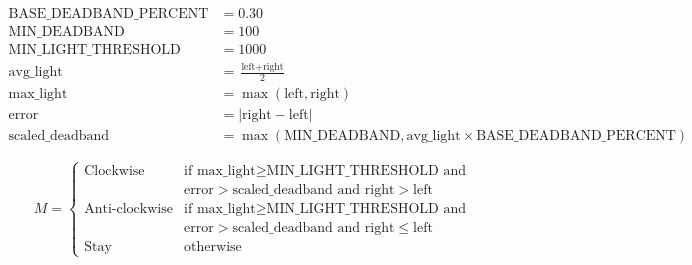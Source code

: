 $$
	\begin{aligned}
		\text{BASE_DEADBAND_PERCENT} & = 0.30                                               \\
		\text{MIN_DEADBAND}          & = 100                                                \\
		\text{MIN_LIGHT_THRESHOLD}   & = 1000                                               \\
		\text{avg_light}             & = \frac{\text{left} + \text{right}}{2}               \\
		\text{max_light}             & = \max(\text{left}, \text{right})                    \\
		\text{error}                 & = |\text{right} - \text{left}|                       \\
		\text{scaled_deadband}       & = \max (\text{MIN_DEADBAND}, \text{avg_light} \times


		\text{BASE_DEADBAND_PERCENT})
	\end{aligned}
$$

$$
	M =
	\begin{cases}
		\text{Clockwise}      & \text{if } \text{max_light} \ge \text{MIN_LIGHT_THRESHOLD} \text{ and }         \\
		                      & \text{error} > \text{scaled_deadband} \text{ and } \text{right} > \text{left}   \\
		\text{Anti-clockwise} & \text{if } \text{max_light} \ge \text{MIN_LIGHT_THRESHOLD} \text{ and }         \\
		                      & \text{error} > \text{scaled_deadband} \text{ and } \text{right} \le \text{left} \\
		\text{Stay}           & \text{otherwise}
	\end{cases}
$$
